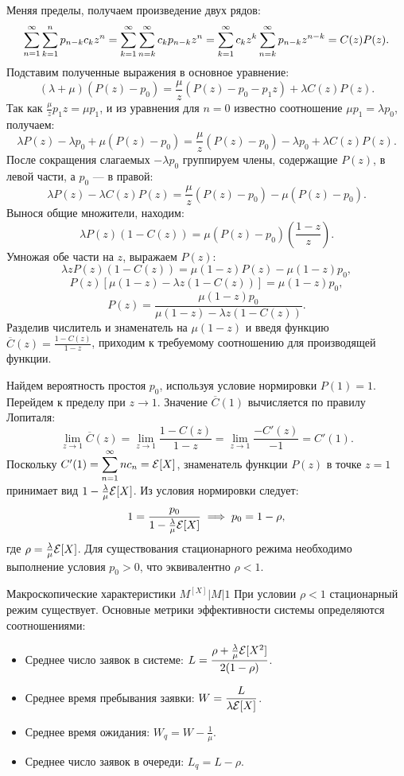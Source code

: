 \begin{sproof}
Меняя пределы, получаем произведение двух рядов:
$$ \displaystyle \sum_{n=1}^{\infty} \displaystyle \sum_{k=1}^{n} p_{n-k} c_k z^n = \displaystyle \sum_{k=1}^{\infty} \displaystyle \sum_{n=k}^{\infty} c_k p_{n-k} z^n = \displaystyle \sum_{k=1}^{\infty} c_k z^k \displaystyle \sum_{n=k}^{\infty} p_{n-k} z^{n-k} = C(z) P(z). $$
Подставим полученные выражения в основное уравнение:
$$ (\lambda + \mu)(P(z) - p_0) = \frac{\mu}{z}(P(z) - p_0 - p_1 z) + \lambda C(z) P(z). $$
Так как $\frac{\mu}{z} p_1 z = \mu p_1$, и из уравнения для $n=0$ известно соотношение $\mu p_1 = \lambda p_0$, получаем:
$$ \lambda P(z) - \lambda p_0 + \mu(P(z) - p_0) = \frac{\mu}{z}(P(z) - p_0) - \lambda p_0 + \lambda C(z) P(z). $$
После сокращения слагаемых $-\lambda p_0$ группируем члены, содержащие $P(z)$, в левой части, а $p_0$ — в правой:
$$ \lambda P(z) - \lambda C(z) P(z) = \frac{\mu}{z}(P(z) - p_0) - \mu(P(z) - p_0). $$
Вынося общие множители, находим:
$$ \lambda P(z) (1 - C(z)) = \mu (P(z) - p_0) \left( \frac{1 - z}{z} \right). $$
Умножая обе части на $z$, выражаем $P(z)$:
$$ \lambda z P(z) (1 - C(z)) = \mu (1 - z) P(z) - \mu (1 - z) p_0, $$
$$ P(z) \left[ \mu(1 - z) - \lambda z (1 - C(z)) \right] = \mu(1 - z) p_0, $$
$$ P(z) = \frac{\mu(1 - z) p_0}{\mu(1 - z) - \lambda z (1 - C(z))}. $$
Разделив числитель и знаменатель на $\mu(1 - z)$ и введя функцию $\overline{C}(z) = \frac{1 - C(z)}{1 - z}$, приходим к требуемому соотношению для производящей функции.

Найдем вероятность простоя $p_0$, используя условие нормировки $P(1) = 1$. Перейдем к пределу при $z \to 1$. Значение $\overline{C}(1)$ вычисляется по правилу Лопиталя:
$$ \lim_{z \to 1} \overline{C}(z) = \lim_{z \to 1} \frac{1 - C(z)}{1 - z} = \lim_{z \to 1} \frac{-C'(z)}{-1} = C'(1). $$
Поскольку $C'(1) = \displaystyle \sum_{n=1}^{\infty} n c_n = \mathcal{E}[X]$, знаменатель функции $P(z)$ в точке $z=1$ принимает вид $1 - \frac{\lambda}{\mu} \mathcal{E}[X]$. Из условия нормировки следует:
$$ 1 = \frac{p_0}{1 - \frac{\lambda}{\mu} \mathcal{E}[X]} \implies p_0 = 1 - \rho, $$
где $\rho = \frac{\lambda}{\mu} \mathcal{E}[X]$. Для существования стационарного режима необходимо выполнение условия $p_0 > 0$, что эквивалентно $\rho < 1$.
\end{sproof}

\begin{theorem}{Макроскопические характеристики $M^{[X]}|M|1$}
При условии $\rho < 1$ стационарный режим существует. Основные метрики эффективности системы определяются соотношениями:
\begin{itemize}
    \item Среднее число заявок в системе: $\displaystyle L = \frac{\rho + \frac{\lambda}{\mu}\mathcal{E}[X^2]}{2(1 - \rho)}$.
    \item Среднее время пребывания заявки: $\displaystyle W = \frac{L}{\lambda \mathcal{E}[X]}$.
    \item Среднее время ожидания: $\displaystyle W_q = W - \frac{1}{\mu}$.
    \item Среднее число заявок в очереди: $\displaystyle L_q = L - \rho$.
\end{itemize}
\end{theorem}


